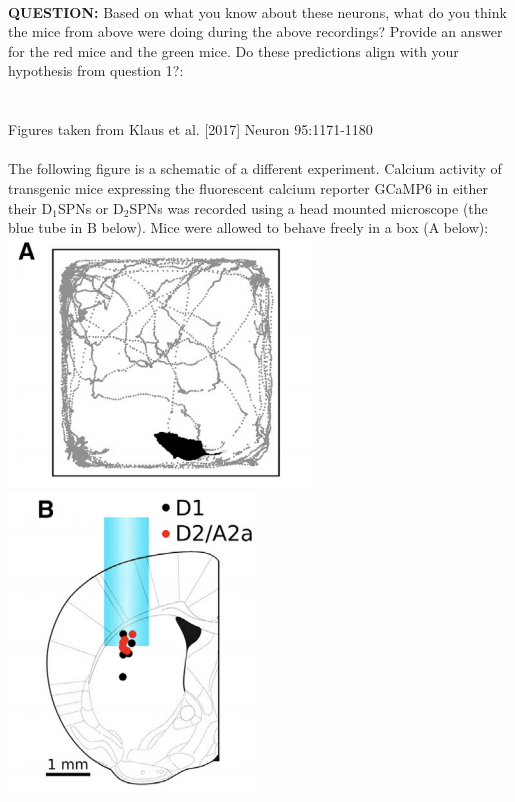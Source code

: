 \documentclass{article}
\begin{document}
\\\textbf{QUESTION:} Based on what you know about these neurons, what do you think the mice from above were doing during the above recordings? Provide an answer for the red mice and the green mice. Do these predictions align with your hypothesis from question 1?:\\



\section{ }
Figures taken from Klaus et al. [2017] Neuron 95:1171-1180
\\\\The following figure is a schematic of a different experiment. Calcium activity of transgenic mice expressing the fluorescent calcium reporter GCaMP6 in either their D$_1$SPNs or D$_2$SPNs was recorded using a head mounted microscope (the blue tube in B below). Mice were allowed to behave freely in a box (A below):\\
\includegraphics[]{2.1.png} \includegraphics[]{2.2}\\
\end{document}

